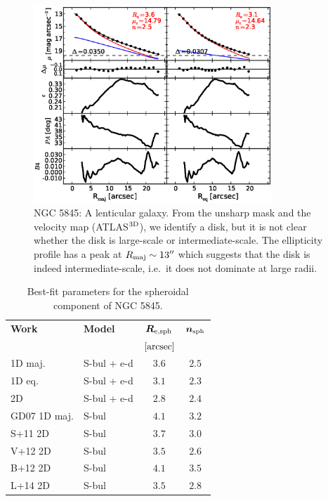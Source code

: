 \documentclass[preprint2]{emulateapj}
\newcommand{\fitfigurewidth}{0.8\textwidth}
\begin{document}
  \begin{figure}[h]
  \begin{center}
  \includegraphics[width=\fitfigurewidth]{images/n5845_1Dfit.eps}
  \caption{NGC 5845: 
  A lenticular galaxy. 
  From the unsharp mask and the velocity map (ATLAS$^{\rm 3D}$), we identify a disk, but it is not clear whether the disk is large-scale or intermediate-scale.
  The ellipticity profile has a peak at $R_{\rm maj} \sim 13''$ which suggests that the disk is indeed intermediate-scale, 
  i.e.~it does not dominate at large radii.
  }
  \end{center}
  \end{figure}

  \begin{table}[h]
  \small
  \caption{Best-fit parameters for the spheroidal component of NGC 5845.}
  \begin{center}
  \begin{tabular}{llcc}
  \hline
  {\bf Work} & {\bf Model}   & $\bm R_{\rm e,sph}$    & $\bm n_{\rm sph}$ \\
    &  &  $[\rm arcsec]$ & \\
  \hline
  1D maj. & S-bul + e-d & $3.6$  &  $2.5$ \\
  1D eq.  & S-bul + e-d & $3.1$  &  $2.3$ \\
  2D      & S-bul + e-d & $2.8$  &  $2.4$ \\
  \hline
  GD07 1D maj.      & S-bul & $4.1$  &  $3.2$ \\
  S+11 2D      & S-bul & $3.7$  &  $3.0$ \\
  V+12 2D      & S-bul & $3.5$  &  $2.6$ \\
  B+12 2D      & S-bul & $4.1$  &  $3.5$ \\
  L+14 2D      & S-bul & $3.5$  &  $2.8$ \\
  \hline
  \end{tabular}
  \end{center}
  \label{tab:n5845}
  \end{table}
\end{document}
